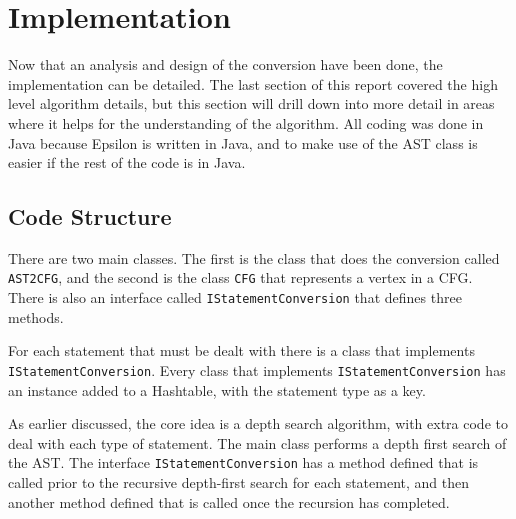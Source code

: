 \section{Implementation}

Now that an analysis and design of the conversion have been done, the implementation can be detailed. The last section of this report covered the high level algorithm details, but this section will drill down into more detail in areas where it helps for the understanding of the algorithm. All coding was done in Java because Epsilon is written in Java, and to make use of the AST class is easier if the rest of the code is in Java.

\subsection{Code Structure}

There are two main classes. The first is the class that does the conversion called \verb|AST2CFG|, and the second is the class \verb|CFG| that represents a vertex in a CFG. There is also an interface called \verb|IStatementConversion| that defines three methods. 

For each statement that must be dealt with there is a class that implements \verb|IStatementConversion|. Every class that implements \verb|IStatementConversion| has an instance added to a Hashtable, with the statement type as a key.

As earlier discussed, the core idea is a depth search algorithm, with extra code to deal with each type of statement. The main class performs a depth first search of the AST. The interface \verb|IStatementConversion| has a method defined that is called prior to the recursive depth-first search for each statement, and then another method defined that is called once the recursion has completed. 

